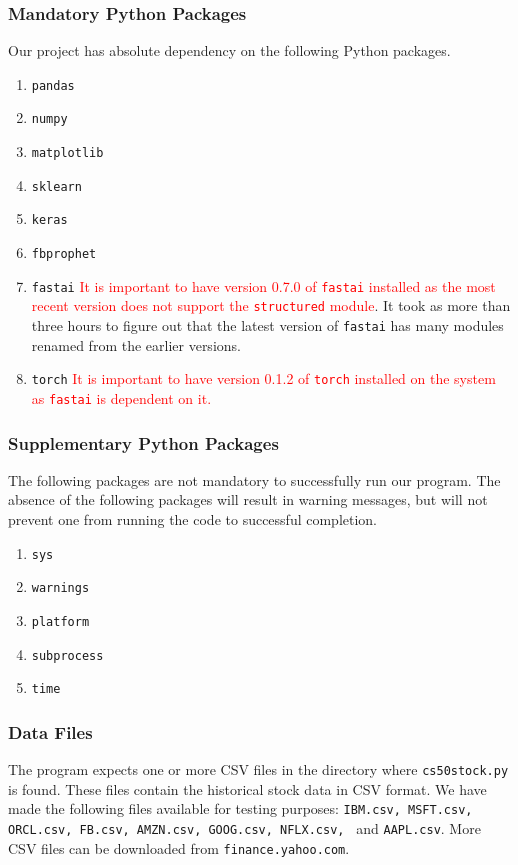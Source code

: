 \documentclass[12pt, oneside]{article}   	%
\begin{document}
\subsubsection{Mandatory Python Packages}
Our project has absolute dependency on the following Python packages.
\begin{enumerate}
\item {\tt pandas}
\item {\tt numpy}
\item {\tt matplotlib}
\item {\tt sklearn}
\item {\tt keras}
\item {\tt fbprophet}
\item {\tt fastai} \textcolor{red}{It is important to have version 0.7.0 of {\tt fastai} installed as the most recent version does not support the {\tt structured} module}. It took as more than three hours to figure out that the latest version of {\tt fastai} has many modules renamed from the earlier versions.
\item {\tt torch} \textcolor{red}{It is important to have version 0.1.2 of {\tt torch} installed on the system as {\tt fastai} is dependent on it.}
\end{enumerate}

\subsubsection{Supplementary Python Packages}
The following packages are not mandatory to successfully run our program. The absence of the following packages will result in warning messages, but will not prevent one from running the code to successful completion. 
\begin{enumerate}
\item {\tt sys}
\item {\tt warnings}
\item {\tt platform}
\item {\tt subprocess}
\item {\tt time}
\end{enumerate}

\subsubsection{Data Files}

The program expects one or more CSV files in the directory where {\tt cs50stock.py} is found. These files contain the historical stock data in CSV format. We have made the following files available for testing purposes: {\tt IBM.csv, MSFT.csv, ORCL.csv, FB.csv, AMZN.csv, GOOG.csv, NFLX.csv, } and {\tt AAPL.csv}. 
More CSV files can be downloaded from {\tt finance.yahoo.com}.
\end{document}
